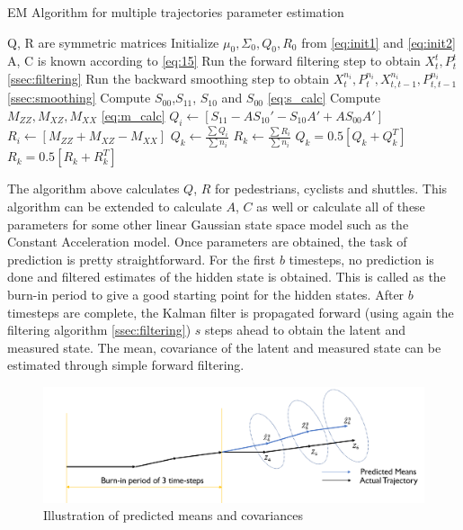 \documentclass{article}
\begin{document}
\begin{algorithm}[H]
\caption{ EM Algorithm for multiple trajectories parameter estimation}\label{alg:em}
\begin{algorithmic}[1]
\Ensure Q, R are symmetric matrices
\State  Initialize $\mu_0,\Sigma_0, Q_0, R_0$ from \ref{eq:init1} and  \ref{eq:init2}
\State A, C is known according to \ref{eq:15}
            \State Run the forward filtering step to obtain $X_{t}^{t}, P_{t}^t$ \ref{ssec:filtering}
            \State Run the backward smoothing step to obtain  $X_{t}^{n_i}, P_{t}^{n_i}, X_{t,t-1}^{n_i}, P_{t,t-1}^{n_i}$  \ref{ssec:smoothing}
            \State Compute $S_{00}$,$S_{11}$, $S_{10}$ and $S_{00}$ \ref{eq:s_calc}
            \State Compute $M_{ZZ}, M_{XZ}, M_{XX}$ \ref{eq:m_calc}
            \State $Q_i \gets [S_{11}-AS_{10}'-S_{10}A'+AS_{00}A']$ 
            \State $R_i \gets [M_{ZZ}+M_{XZ}-M_{XX}]$
        \EndFor
        \State $Q_k \gets \frac{\sum{Q_i}}{\sum{n_i}}$
        \State $R_k \gets \frac{\sum{R_i}}{\sum{n_i}}$
        \State $Q_k=0.5[Q_k+Q_k^T]$
        \State $R_k=0.5[R_k+R_k^T]$
    \EndWhile
\EndFor
\end{algorithmic}
\end{algorithm}

The algorithm above calculates $Q$, $R$ for pedestrians, cyclists and shuttles. This algorithm can be extended to calculate $A$, $C$ as well or calculate all of these parameters for some other linear Gaussian state space model such as the Constant Acceleration model.  Once parameters are obtained, the task of prediction is pretty straightforward. For the first $b$ timesteps, no prediction is done and filtered estimates of the hidden state is obtained. This is called as the burn-in period to give a good starting point for the hidden states.  After $b$ timesteps are complete, the Kalman filter is propagated forward (using again the filtering algorithm \ref{ssec:filtering}) $s$ steps ahead to obtain the latent and measured state. The mean, covariance of the latent and measured state can be estimated through simple forward filtering. 

\begin{figure}[H]
\centering
\includegraphics[scale=0.5]{method/cov_prediction.PNG}
\caption{Illustration of predicted means and covariances}
\end{figure}
\end{document}

